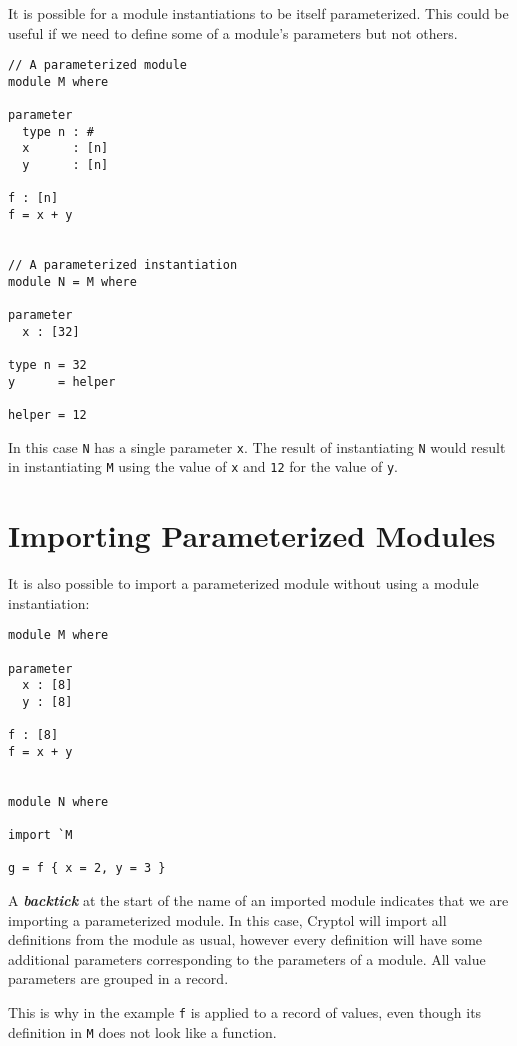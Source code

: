 It is possible for a module instantiations to be itself parameterized.
This could be useful if we need to define some of a module's parameters
but not others.

\begin{verbatim}
// A parameterized module
module M where

parameter
  type n : #
  x      : [n]
  y      : [n]

f : [n]
f = x + y


// A parameterized instantiation
module N = M where

parameter
  x : [32]

type n = 32
y      = helper

helper = 12
\end{verbatim}

In this case \texttt{N} has a single parameter \texttt{x}. The result of
instantiating \texttt{N} would result in instantiating \texttt{M} using
the value of \texttt{x} and \texttt{12} for the value of \texttt{y}.

\hypertarget{importing-parameterized-modules}{%
\section{Importing Parameterized
Modules}\label{importing-parameterized-modules}}

It is also possible to import a parameterized module without using a
module instantiation:

\begin{verbatim}
module M where

parameter
  x : [8]
  y : [8]

f : [8]
f = x + y


module N where

import `M

g = f { x = 2, y = 3 }
\end{verbatim}

A \textbf{\emph{backtick}} at the start of the name of an imported
module indicates that we are importing a parameterized module. In this
case, Cryptol will import all definitions from the module as usual,
however every definition will have some additional parameters
corresponding to the parameters of a module. All value parameters are
grouped in a record.

This is why in the example \texttt{f} is applied to a record of values,
even though its definition in \texttt{M} does not look like a function.
